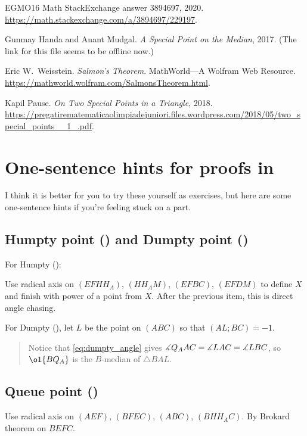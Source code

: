 \documentclass[11pt]{scrartcl}
\begin{document}
\begin{thebibliography}{EGMO16}
  Math StackExchange answer 3894697, 2020.
  \url{https://math.stackexchange.com/a/3894697/229197}.

  Gunmay Handa and Anant Mudgal.
  \textit{A Special Point on the Median}, 2017.
  (The link for this file seems to be offline now.)

  Eric W.\ Weisstein. \textit{Salmon's Theorem}.
  MathWorld---A Wolfram Web Resource.
  \url{https://mathworld.wolfram.com/SalmonsTheorem.html}.

  Kapil Pause. \textit{On Two Special Points in a Triangle}, 2018.
  \url{https://pregatirematematicaolimpiadejuniori.files.wordpress.com/2018/05/two_special_points__1_.pdf}.
\end{thebibliography}

\newpage

\appendix
\section{One-sentence hints for proofs in }
\label{sec:hints}

I think it is better for you to try these yourself as exercises,
but here are some one-sentence hints if you're feeling stuck on a part.

\subsection{Humpty point () and Dumpty point ()}
For Humpty ():
\begin{enumerate}
  \ii Use radical axis on $(EFHH_A)$, $(HH_AM)$, $(EFBC)$, $(EFDM)$ to define $X$
  and finish with power of a point from $X$.
  \ii After the previous item, this is direct angle chasing.
\end{enumerate}
For Dumpty (), let $L$ be the point on $(ABC)$ so that $(AL;BC) = -1$.
\begin{quote}
  Notice that \eqref{eq:dumpty_angle} gives $\measuredangle Q_A AC = \measuredangle LAC = \measuredangle LBC$,
  so $\ol{BQ_A}$ is the $B$-median of $\triangle BAL$.
\end{quote}

\subsection{Queue point ()}
\begin{enumerate}
  \ii Use radical axis on $(AEF)$, $(BFEC)$, $(ABC)$, $(BHH_AC)$.
  \ii By Brokard theorem on $BEFC$.
\end{enumerate}
\end{document}
